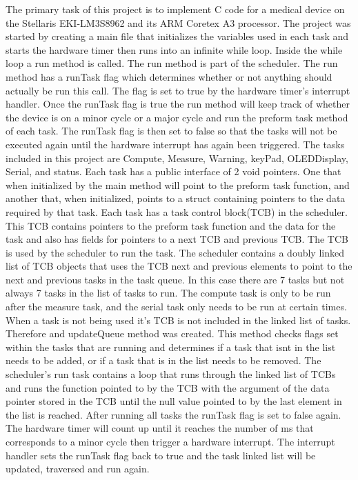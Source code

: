\documentclass[12pt]{article} %
\begin{document}

    The primary task of this project is to implement C code for a medical
    device on the Stellaris EKI-LM3S8962 and its ARM Coretex A3 processor. The
    project was started by creating a main file that initializes the variables
    used in each task and starts the hardware timer then runs into an infinite
    while loop. Inside the while loop a run method is called. The run method is
    part of the scheduler. The run method has a runTask flag which determines
    whether or not anything should actually be run this call. The flag is set
    to true by the hardware timer's interrupt handler. Once the runTask flag is
    true the run method will keep track of whether the device is on a minor
    cycle or a major cycle and run the preform task method of each task. The
    runTask flag is then set to false so that the tasks will not be executed
    again until the hardware interrupt has again been triggered. The tasks
    included in this project are Compute, Measure, Warning, keyPad,
    OLEDDisplay, Serial, and status. Each task has a public interface of 2 void
    pointers. One that when initialized by the main method will point to the
    preform task function, and another that, when initialized, points to a
    struct containing pointers to the data required by that task. Each task has
    a task control block(TCB) in the scheduler. This TCB contains pointers to
    the preform task function and the data for the task and also has fields for
    pointers to a next TCB and previous TCB. The TCB is used by the scheduler
    to run the task. The scheduler contains a doubly linked list of TCB objects
    that uses the TCB next and previous elements to point to the next and
    previous tasks in the task queue. In this case there are 7 tasks but not
    always 7 tasks in the list of tasks to run. The compute task is only to be
    run after the measure task, and the serial task only needs to be run at
    certain times. When a task is not being used it's TCB is not included in
    the linked list of tasks. Therefore and updateQueue method was created.
    This method checks flags set within the tasks that are running and
    determines if a task that isnt in the list needs to be added, or if a task
    that is in the list needs to be removed. The scheduler's run task contains
    a loop that runs through the linked list of TCBs and runs the function
    pointed to by the TCB with the argument of the data pointer stored in the
    TCB until the null value pointed to by the last element in the list is
    reached. After running all  tasks the runTask flag is set to false again.
    The hardware timer will count up until it reaches the number of ms that
    corresponds to a minor cycle then trigger a hardware interrupt. The
    interrupt handler sets the runTask flag back to true and the task linked
    list will be updated, traversed and run again.
    
\end{document}
